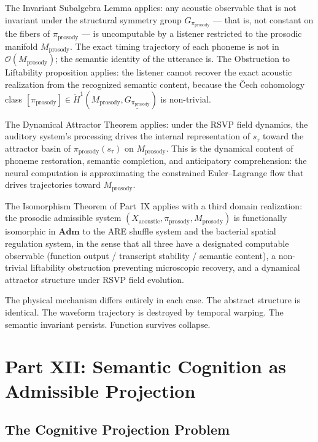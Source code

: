\documentclass[12pt, a4paper]{article}
\theoremstyle{essaystyle}
\begin{document}
The Invariant Subalgebra Lemma applies: any acoustic observable that is not invariant
under the structural symmetry group $G_{\pi_{\mathrm{prosody}}}$ --- that is, not
constant on the fibers of $\pi_{\mathrm{prosody}}$ --- is uncomputable by a listener
restricted to the prosodic manifold $M_{\mathrm{prosody}}$. The exact timing trajectory
of each phoneme is not in $\mathcal{O}(M_{\mathrm{prosody}})$; the semantic identity
of the utterance is. The Obstruction to Liftability proposition applies: the listener
cannot recover the exact acoustic realization from the recognized semantic content,
because the Čech cohomology class $[\pi_{\mathrm{prosody}}] \in \check{H}^1(M_{\mathrm{prosody}},
\underline{G_{\pi_{\mathrm{prosody}}}})$ is non-trivial.

The Dynamical Attractor Theorem applies: under the RSVP field dynamics, the auditory
system's processing drives the internal representation of $s_\tau$ toward the attractor
basin of $\pi_{\mathrm{prosody}}(s_\tau)$ on $M_{\mathrm{prosody}}$. This is the
dynamical content of phoneme restoration, semantic completion, and anticipatory
comprehension: the neural computation is approximating the constrained Euler--Lagrange
flow that drives trajectories toward $M_{\mathrm{prosody}}$.

The Isomorphism Theorem of Part~IX applies with a third domain realization: the
prosodic admissible system $(X_{\mathrm{acoustic}}, \pi_{\mathrm{prosody}},
M_{\mathrm{prosody}})$ is functionally isomorphic in $\mathbf{Adm}$ to the ARE shuffle
system and the bacterial spatial regulation system, in the sense that all three have
a designated computable observable (function output / transcript stability / semantic
content), a non-trivial liftability obstruction preventing microscopic recovery, and
a dynamical attractor structure under RSVP field evolution.

The physical mechanism differs entirely in each case. The abstract structure is
identical. The waveform trajectory is destroyed by temporal warping. The semantic
invariant persists. Function survives collapse.

\section{Part XII: Semantic Cognition as Admissible Projection}

\subsection{The Cognitive Projection Problem}
\end{document}
